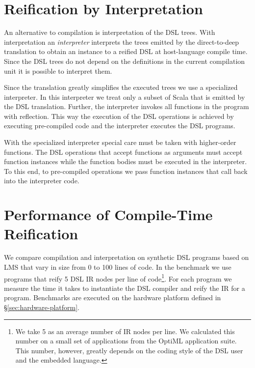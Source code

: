 \section{Reification by Interpretation}
\label{sec:reification-by-interpretation}

An alternative to compilation is interpretation of the DSL trees. With interpretation
 an \emph{interpreter} interprets the trees emitted by the direct-to-deep translation to obtain
 an instance to a reified DSL at host-language compile time. Since the DSL trees do not depend
 on the definitions in the current compilation unit it is possible to interpret them.

Since the \yy translation greatly simplifies the executed trees we use a specialized interpreter.
 In this interpreter we treat only a subset of Scala that is emitted by the DSL translation.
 Further, the interpreter invokes all functions in the program with reflection. This way the
 execution of the DSL operations is achieved by executing pre-compiled code and the interpreter
 executes the DSL programs.

With the specialized interpreter special care must be taken with higher-order functions. The DSL operations
 that accept functions as arguments must accept function instances while the
 function bodies must be executed in the interpreter. To this end, to pre-compiled
 operations we pass function instances that call back into the interpreter code.

\section{Performance of Compile-Time Reification}
\label{sec:performance-of-host-langauge-compile-time-reification}

We compare compilation and interpretation on synthetic DSL programs based on LMS that vary in size from
 0 to 100 lines of code. In the benchmark we use programs that reify 5 DSL IR nodes
 per line of code\footnote{We take 5 as an average number of IR nodes per line. We calculated this number on a small set of applications from the OptiML application suite. This number, however, greatly depends on the coding style of the DSL user and the embedded language.}. For each program we measure the time it takes to instantiate the DSL compiler and
 reify the IR for a program. Benchmarks are executed on the hardware platform defined in \S \ref{sec:hardware-platform}.

